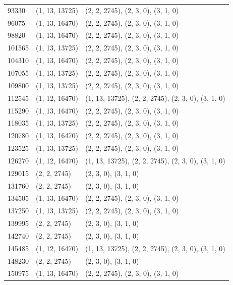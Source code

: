 \begin{longtable}{@{\extracolsep{\fill}}lll}
93330  & (1, 13, 13725) & (2, 2, 2745), (2, 3, 0), (3, 1, 0)                  \\
96075  & (1, 13, 16470) & (2, 2, 2745), (2, 3, 0), (3, 1, 0)                  \\
98820  & (1, 13, 16470) & (2, 2, 2745), (2, 3, 0), (3, 1, 0)                  \\
101565 & (1, 13, 13725) & (2, 2, 2745), (2, 3, 0), (3, 1, 0)                  \\
104310 & (1, 13, 16470) & (2, 2, 2745), (2, 3, 0), (3, 1, 0)                  \\
107055 & (1, 13, 13725) & (2, 2, 2745), (2, 3, 0), (3, 1, 0)                  \\
109800 & (1, 13, 13725) & (2, 2, 2745), (2, 3, 0), (3, 1, 0)                  \\
112545 & (1, 12, 16470) & (1, 13, 13725), (2, 2, 2745), (2, 3, 0), (3, 1, 0)  \\
115290 & (1, 13, 16470) & (2, 2, 2745), (2, 3, 0), (3, 1, 0)                  \\
118035 & (1, 13, 13725) & (2, 2, 2745), (2, 3, 0), (3, 1, 0)                  \\
120780 & (1, 13, 16470) & (2, 2, 2745), (2, 3, 0), (3, 1, 0)                  \\
123525 & (1, 13, 13725) & (2, 2, 2745), (2, 3, 0), (3, 1, 0)                  \\
126270 & (1, 12, 16470) & (1, 13, 13725), (2, 2, 2745), (2, 3, 0), (3, 1, 0)  \\
129015 & (2, 2, 2745)   & (2, 3, 0), (3, 1, 0)                                \\
131760 & (2, 2, 2745)   & (2, 3, 0), (3, 1, 0)                                \\
134505 & (1, 13, 16470) & (2, 2, 2745), (2, 3, 0), (3, 1, 0)                  \\
137250 & (1, 13, 13725) & (2, 2, 2745), (2, 3, 0), (3, 1, 0)                  \\
139995 & (2, 2, 2745)   & (2, 3, 0), (3, 1, 0)                                \\
142740 & (2, 2, 2745)   & (2, 3, 0), (3, 1, 0)                                \\
145485 & (1, 12, 16470) & (1, 13, 13725), (2, 2, 2745), (2, 3, 0), (3, 1, 0)  \\
148230 & (2, 2, 2745)   & (2, 3, 0), (3, 1, 0)                                \\
150975 & (1, 13, 16470) & (2, 2, 2745), (2, 3, 0), (3, 1, 0)                  \\

\end{longtable}

